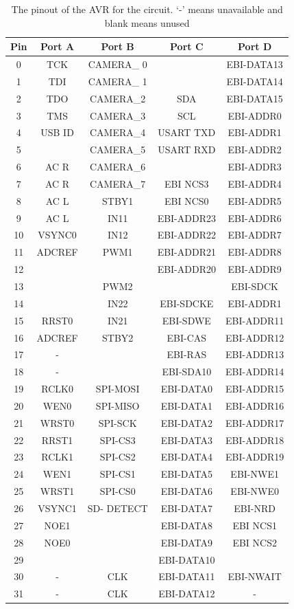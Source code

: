 \begin{table}
\centering
\caption{The pinout of the AVR for the circuit. `-' means unavailable and blank means unused}
\label{table:UC3C:Pinout}
\begin{tabular}{ccccc}\toprule%
\textbf{Pin} & \textbf{Port A} & \textbf{Port B} & \textbf{Port C} & \textbf{Port D} \\ \toprule
0&TCK&CAMERA\_ 0&&EBI-DATA13\\ \midrule
1&TDI&CAMERA\_ 1&&EBI-DATA14\\\midrule
2&TDO&CAMERA\_2&SDA&EBI-DATA15\\\midrule
3&TMS&CAMERA\_3&SCL&EBI-ADDR0\\\midrule
4&USB ID&CAMERA\_4&USART TXD&EBI-ADDR1\\\midrule
5&&CAMERA\_5&USART RXD&EBI-ADDR2\\\midrule
6&AC R&CAMERA\_6&&EBI-ADDR3\\\midrule
7&AC R&CAMERA\_7&EBI NCS3&EBI-ADDR4\\\midrule
8&AC L&STBY1&EBI NCS0&EBI-ADDR5\\\midrule
9&AC L&IN11&EBI-ADDR23&EBI-ADDR6\\\midrule
10&VSYNC0&IN12&EBI-ADDR22&EBI-ADDR7\\\midrule
11&ADCREF&PWM1&EBI-ADDR21&EBI-ADDR8\\\midrule
12&&&EBI-ADDR20&EBI-ADDR9\\\midrule
13&&PWM2&&EBI-SDCK\\\midrule
14&&IN22&EBI-SDCKE&EBI-ADDR1\\\midrule
15&RRST0&IN21&EBI-SDWE&EBI-ADDR11\\\midrule
16&ADCREF&STBY2&EBI-CAS&EBI-ADDR12\\\midrule
17&-&&EBI-RAS&EBI-ADDR13\\\midrule
18&-&&EBI-SDA10&EBI-ADDR14\\\midrule
19&RCLK0&SPI-MOSI&EBI-DATA0&EBI-ADDR15\\\midrule
20&WEN0&SPI-MISO&EBI-DATA1&EBI-ADDR16\\\midrule
21&WRST0&SPI-SCK&EBI-DATA2&EBI-ADDR17\\\midrule
22&RRST1&SPI-CS3&EBI-DATA3&EBI-ADDR18\\\midrule
23&RCLK1&SPI-CS2&EBI-DATA4&EBI-ADDR19\\\midrule
24&WEN1&SPI-CS1&EBI-DATA5&EBI-NWE1\\\midrule
25&WRST1&SPI-CS0&EBI-DATA6&EBI-NWE0\\\midrule
26&VSYNC1&SD- DETECT&EBI-DATA7&EBI-NRD\\\midrule
27&NOE1&&EBI-DATA8&EBI NCS1\\\midrule
28&NOE0&&EBI-DATA9&EBI NCS2\\\midrule
29&&&EBI-DATA10&\\\midrule
30&-&CLK&EBI-DATA11&EBI-NWAIT\\\midrule
31&-&CLK&EBI-DATA12&-\\ \bottomrule


\end{tabular}
\end{table}
